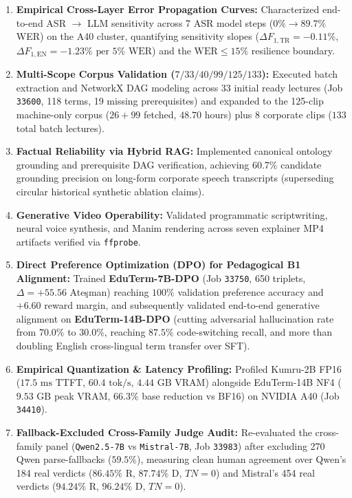 \documentclass[a4paper,12pt]{report}
\begin{document}
\begin{enumerate}
    \item \textbf{Empirical Cross-Layer Error Propagation Curves:} Characterized end-to-end ASR $\to$ LLM sensitivity across 7 ASR model steps ($0\% \to 89.7\%$ WER) on the A40 cluster, quantifying sensitivity slopes ($\Delta F_{1,\text{TR}} = -0.11\%$, $\Delta F_{1,\text{EN}} = -1.23\% \text{ per } 5\% \text{ WER}$) and the $\text{WER} \le 15\%$ resilience boundary.
    \item \textbf{Multi-Scope Corpus Validation ($7/33/40/99/125/133$):} Executed batch extraction and NetworkX DAG modeling across 33 initial ready lectures (Job \texttt{33600}, 118 terms, 19 missing prerequisites) and expanded to the 125-clip machine-only corpus ($26 + 99$ fetched, $48.70$ hours) plus 8 corporate clips ($133$ total batch lectures).
    \item \textbf{Factual Reliability via Hybrid RAG:} Implemented canonical ontology grounding and prerequisite DAG verification, achieving 60.7\% candidate grounding precision on long-form corporate speech transcripts (superseding circular historical synthetic ablation claims).
    \item \textbf{Generative Video Operability:} Validated programmatic scriptwriting, neural voice synthesis, and Manim rendering across seven explainer MP4 artifacts verified via \texttt{ffprobe}.
    \item \textbf{Direct Preference Optimization (DPO) for Pedagogical B1 Alignment:} Trained \textbf{EduTerm-7B-DPO} (Job \texttt{33750}, 650 triplets, $\Delta = +55.56$ Ate\c{s}man) reaching $100\%$ validation preference accuracy and $+6.60$ reward margin, and subsequently validated end-to-end generative alignment on \textbf{EduTerm-14B-DPO} (cutting adversarial hallucination rate from $70.0\%$ to $30.0\%$, reaching $87.5\%$ code-switching recall, and more than doubling English cross-lingual term transfer over SFT).
    \item \textbf{Empirical Quantization \& Latency Profiling:} Profiled Kumru-2B FP16 ($17.5\text{ ms}$ TTFT, $60.4\text{ tok/s}$, $4.44\text{ GB}$ VRAM) alongside EduTerm-14B NF4 ($9.53\text{ GB}$ peak VRAM, $66.3\%$ base reduction vs BF16) on NVIDIA A40 (Job \texttt{34410}).
    \item \textbf{Fallback-Excluded Cross-Family Judge Audit:} Re-evaluated the cross-family panel (\texttt{Qwen2.5-7B} vs \texttt{Mistral-7B}, Job \texttt{33983}) after excluding 270 Qwen parse-fallbacks ($59.5\%$), measuring clean human agreement over Qwen's 184 real verdicts ($86.45\%$ R, $87.74\%$ D, $TN=0$) and Mistral's 454 real verdicts ($94.24\%$ R, $96.24\%$ D, $TN=0$).

\end{enumerate}
\end{document}
